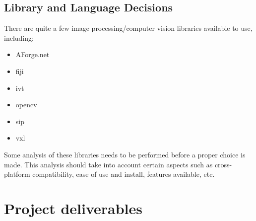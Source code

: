\documentclass[11pt,fleqn,twoside]{article}
\begin{document}
\subsection{Library and Language Decisions}
There are quite a few image processing/computer vision libraries available to use, including:

\begin{itemize}
\item AForge.net
\item \gls{fiji}
\item \gls{ivt}
\item \gls{opencv}
\item \gls{sip}
\item \gls{vxl}
\end{itemize}

Some analysis of these libraries needs to be performed before a proper choice is made. This analysis should take into account certain aspects such as cross-platform compatibility, ease of use and install, features available, etc.






\section{Project deliverables}

\end{document}
